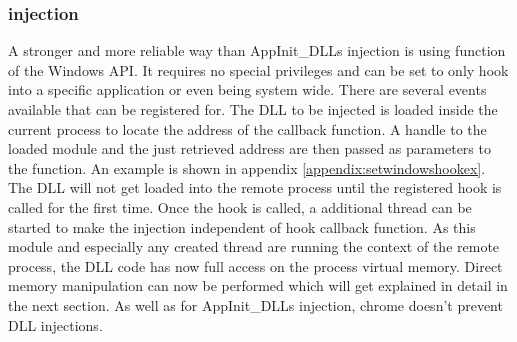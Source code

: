 \subsubsection{ injection}
A stronger and more reliable way than AppInit\_DLLs injection is using  function of the Windows API. It requires no special privileges and can be set to only hook into a specific application or even being system wide. There are several events available that can be registered for. The DLL to be injected is loaded inside the current process to locate the address of the callback function. A handle to the loaded module and the just retrieved address are then passed as parameters to the  function. An example is shown in appendix \ref{appendix:setwindowshookex}. The DLL will not get loaded into the remote process until the registered hook is called for the first time. Once the hook is called, a additional thread can be started to make the injection independent of hook callback function. As this module and especially any created thread are running the context of the remote process, the DLL code has now full access on the process virtual memory. Direct memory manipulation can now be performed which will get explained in detail in the next section. As well as for AppInit\_DLLs injection, chrome doesn't prevent  DLL injections.